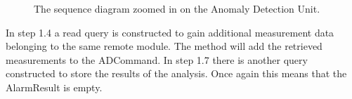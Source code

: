 \begin{figure}
	\begin{centering}
		\caption{The sequence diagram zoomed in on the Anomaly Detection Unit.}
		\label{fig:scenario-5-6c}
	\end{centering}
\end{figure}

\npar In step 1.4 a read query is constructed to gain additional measurement
data belonging to the same remote module. The  method
will add the retrieved measurements to the ADCommand. In step 1.7 there is
another query constructed to store the results of the analysis. Once again this
means that the AlarmResult is empty.



